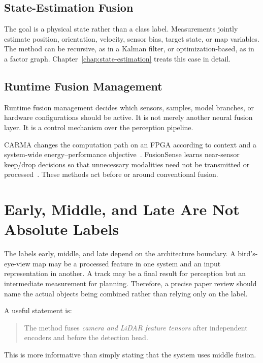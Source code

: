 \subsection{State-Estimation Fusion}

The goal is a physical state rather than a class label. Measurements jointly estimate position, orientation, velocity, sensor bias, target state, or map variables. The method can be recursive, as in a Kalman filter, or optimization-based, as in a factor graph. Chapter~\ref{chap:state-estimation} treats this case in detail.

\subsection{Runtime Fusion Management}

Runtime fusion management decides which sensors, samples, model branches, or hardware configurations should be active. It is not merely another neural fusion layer. It is a control mechanism over the perception pipeline.

CARMA changes the computation path on an FPGA according to context and a system-wide energy--performance objective~\cite{zhang2023carma}. FusionSense learns near-sensor keep/drop decisions so that unnecessary modalities need not be transmitted or processed~\cite{yun2026fusionsense}. These methods act before or around conventional fusion.

\section{Early, Middle, and Late Are Not Absolute Labels}

The labels early, middle, and late depend on the architecture boundary. A bird's-eye-view map may be a processed feature in one system and an input representation in another. A track may be a final result for perception but an intermediate measurement for planning. Therefore, a precise paper review should name the actual objects being combined rather than relying only on the label.

A useful statement is:

\begin{quote}
The method fuses \emph{camera and LiDAR feature tensors} after independent encoders and before the detection head.
\end{quote}

This is more informative than simply stating that the system uses middle fusion.

